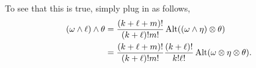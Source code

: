 To see that this is true, simply plug in as follows,
\begin{align*}
    (\omega \wedge \ell) \wedge \theta &= \frac{(k + \ell + m)!}{(k + \ell)! m!} \operatorname{Alt}((\omega \wedge \eta) \otimes \theta) \\
    &= \frac{(k + \ell + m)!}{(k + \ell)! m!} \frac{(k + \ell)!}{k! \ell!} \operatorname{Alt}(\omega \otimes \eta \otimes \theta).
\end{align*}
